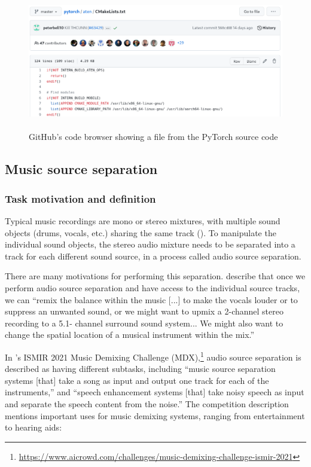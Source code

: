 \documentclass[report.tex]{subfiles}
\begin{document}
\begin{figure}[ht]
	\centering
	\includegraphics[height=6cm]{./images-misc/github.png}
	\caption{GitHub's code browser showing a file from the PyTorch source code}
	\label{fig:githubpytorch}
\end{figure}

\newpagefill

\subsection{Music source separation}
\label{sec:musicsep}

\subsubsection{Task motivation and definition}

Typical music recordings are mono or stereo mixtures, with multiple sound objects (drums, vocals, etc.) sharing the same track (\cite{musicsepintro1}). To manipulate the individual sound objects, the stereo audio mixture needs to be separated into a track for each different sound source, in a process called audio source separation.

There are many motivations for performing this separation. \textcite{musicsepgood} describe that once we perform audio source separation and have access to the individual source tracks, we can ``remix the balance within the music [...] to make the vocals louder or to suppress an unwanted sound, or we might want to upmix a 2-channel stereo recording to a 5.1-
channel surround sound system... We might also want to change the spatial location of a musical instrument within the mix.''

In \textcite{mdx21}'s ISMIR 2021 Music Demixing Challenge (MDX),\footnote{\url{https://www.aicrowd.com/challenges/music-demixing-challenge-ismir-2021}} audio source separation is described as having different subtasks, including ``music source separation systems [that] take a song as input and output one track for each of the instruments,'' and ``speech enhancement systems [that] take noisy speech as input and separate the speech content from the noise.'' The competition description mentions important uses for music demixing systems, ranging from entertainment to hearing aids:
\end{document}
